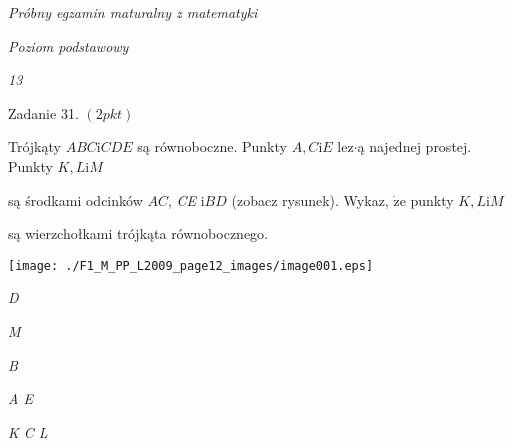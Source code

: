 \documentclass[a4paper,12pt]{article}
\begin{document}
{\it Próbny egzamin maturalny z matematyki}

{\it Poziom podstawowy}

{\it 13}

Zadanie 31. $(2pkt)$

Trójkąty $ABC\mathrm{i}CDE$ są równoboczne. Punkty $A, C\mathrm{i}E$ lez$\cdot$ą najednej prostej. Punkty $K, L\mathrm{i}M$

są środkami odcinków $AC$, {\it CE} $\mathrm{i} BD$ (zobacz rysunek). Wykaz, $\dot{\mathrm{z}}\mathrm{e}$ punkty $K, L \mathrm{i} M$

są wierzchołkami trójkąta równobocznego.
\begin{center}
\texttt{[image: ./F1\_M\_PP\_L2009\_page12\_images/image001.eps]}
\end{center}
{\it D}

{\it M}

{\it B}

{\it A  E}

{\it K C  L}
\end{document}
